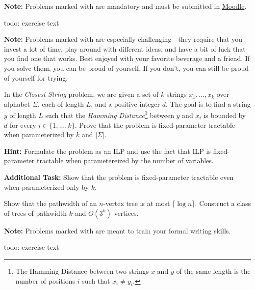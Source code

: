 \documentclass{uebung_cs}
\begin{document}
\textbf{Note:} Problems marked with \mandatory are mandatory and must be submitted in \href{https://moodle.studiumdigitale.uni-frankfurt.de/moodle/course/view.php?id=6259}{Moodle}.

\begin{exercise}
  todo: exercise text
\end{exercise}

\textbf{Note:} Problems marked with \hard are especially challenging---they require that you invest a lot of time, play around with different ideas, and have a bit of luck that you find one that works. Best enjoyed with your favorite beverage and a friend. If you solve them, you can be proud of yourself. If you don't, you can still be proud of yourself for trying.

\begin{exercise}
In the \emph{Closest String} problem, we are given a set of $k$ strings $x_1,\dots,x_k$ over alphabet $\Sigma$, each of length $L$, and a positive integer $d$. The goal is to find a string $y$ of length $L$ such that the \emph{Hamming Distance}\footnote{The Hamming Distance between two strings $x$ and $y$ of the same length is the number of positions $i$ such that $x_i \neq y_i$.} between $y$ and $x_i$ is bounded by $d$ for every $i\in \{1,\dots,k\}$. Prove that the problem is fixed-parameter tractable when parameterized by $k$ and $|\Sigma|$.

\noindent\textbf{Hint:} Formulate the problem as an ILP and use the fact that ILP is fixed-parameter tractable when parametereized by the number of variables.


\noindent\textbf{Additional Task:} Show that the problem is fixed-parameter tractable even when parameterized only by $k$.
\end{exercise}

\begin{exercise}
Show that the pathwidth of an $n$-vertex tree is at most $\lceil \log n \rceil$. Construct a class of trees of pathwidth $k$ and $O(3^k)$ vertices.
\end{exercise}

\newpage
\textbf{Note:} Problems marked with \schriftlich are meant to train your formal writing skills.

\begin{exercise}
  todo: exercise text
\end{exercise}
\end{document}
